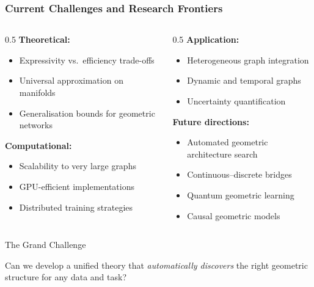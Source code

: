 \begin{frame}[fragile]\frametitle{Current Challenges and Research Frontiers}

\begin{columns}
\begin{column}{0.5\textwidth}
\textbf{Theoretical:}
\begin{itemize}
\item Expressivity vs.\ efficiency trade-offs
\item Universal approximation on manifolds
\item Generalisation bounds for geometric networks
\end{itemize}

\textbf{Computational:}
\begin{itemize}
\item Scalability to very large graphs
\item GPU-efficient implementations
\item Distributed training strategies
\end{itemize}
\end{column}
\begin{column}{0.5\textwidth}
\textbf{Application:}
\begin{itemize}
\item Heterogeneous graph integration
\item Dynamic and temporal graphs
\item Uncertainty quantification
\end{itemize}

\textbf{Future directions:}
\begin{itemize}
\item Automated geometric architecture search
\item Continuous--discrete bridges
\item Quantum geometric learning
\item Causal geometric models
\end{itemize}
\end{column}
\end{columns}

\begin{alertblock}{The Grand Challenge}
\begin{center}
Can we develop a unified theory that \emph{automatically discovers} the right geometric structure for any data and task?
\end{center}
\end{alertblock}

\end{frame}
